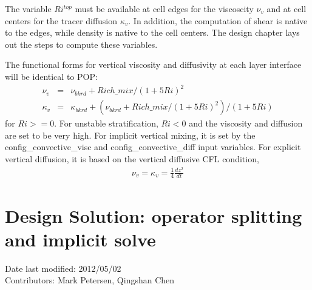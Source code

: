 \documentclass[11pt]{report}
\begin{document}
The variable $Ri^{top}$ must be available at cell edges for the viscoscity $\nu_v$ and at cell centers for the tracer diffusion $\kappa_v$.  In addition, the computation of shear is native to the edges, while density is native to the cell centers.  The design chapter lays out the steps to compute these variables.


The functional forms for vertical viscosity and diffusivity at each layer interface will be identical to POP:
\begin{eqnarray} \label{visc1}  
\nu_v &=& \nu_{bkrd} + Rich\_mix/(1+5Ri)^2\\
\kappa_v &=& \kappa_{bkrd} + (\nu_{bkrd} + Rich\_mix/(1+5Ri)^2)/(1+5Ri)
\end{eqnarray}
for $Ri>=0$.  For unstable stratification, $Ri<0$ and the viscosity and diffusion are set to be very high.  For implicit vertical mixing, it is set by the config\_convective\_visc and config\_convective\_diff input variables.  For explicit vertical diffusion, it is based on the vertical diffusive CFL condition,
\begin{eqnarray} \label{visc2}  
\nu_v = 
\kappa_v = \frac{1}{4} \frac{dz^2}{dt}
\end{eqnarray}


\section{Design Solution: operator splitting and implicit solve}
Date last modified: 2012/05/02 \\
Contributors: Mark Petersen, Qingshan Chen \\
\end{document}
